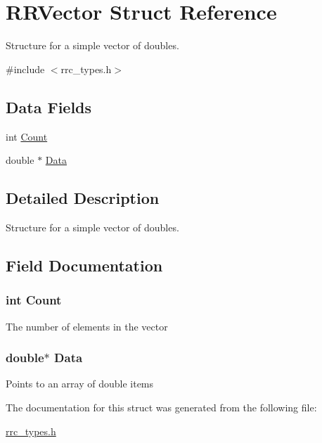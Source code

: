 \hypertarget{struct_r_r_vector}{\section{R\-R\-Vector Struct Reference}
\label{struct_r_r_vector}
}


Structure for a simple vector of doubles.  




{\ttfamily \#include $<$rrc\-\_\-types.\-h$>$}

\subsection*{Data Fields}
\begin{DoxyCompactItemize}
\item 
int \hyperlink{struct_r_r_vector_aad462966ed963f892117056de1eba502}{Count}
\item 
double $\ast$ \hyperlink{struct_r_r_vector_a7c5cbda3aa940f4b0d6e8a1679307dfc}{Data}
\end{DoxyCompactItemize}


\subsection{Detailed Description}
Structure for a simple vector of doubles. 

\subsection{Field Documentation}
\hypertarget{struct_r_r_vector_aad462966ed963f892117056de1eba502}{
\subsubsection[{Count}]{\setlength{\rightskip}{0pt plus 5cm}int Count}}\label{struct_r_r_vector_aad462966ed963f892117056de1eba502}
The number of elements in the vector \hypertarget{struct_r_r_vector_a7c5cbda3aa940f4b0d6e8a1679307dfc}{
\subsubsection[{Data}]{\setlength{\rightskip}{0pt plus 5cm}double$\ast$ Data}}\label{struct_r_r_vector_a7c5cbda3aa940f4b0d6e8a1679307dfc}
Points to an array of double items 

The documentation for this struct was generated from the following file\-:\begin{DoxyCompactItemize}
\item 
\hyperlink{rrc__types_8h}{rrc\-\_\-types.\-h}\end{DoxyCompactItemize}
